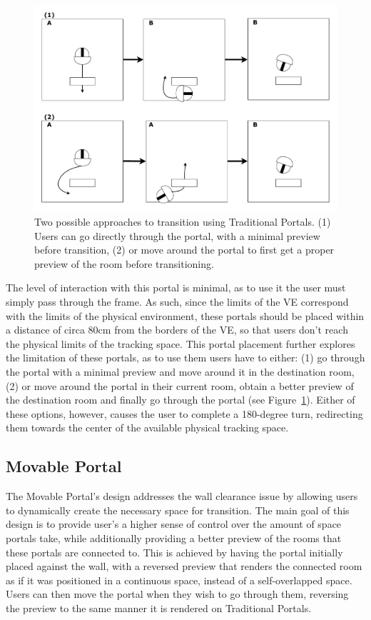 \begin{figure}[b]
    \centering
     \includegraphics[width=.75\textwidth]{NOVAthesisFiles/Images/schemes/trad-interaction.drawio.pdf}
     \caption[Interaction design of the Traditional Portal.]
     {Two possible approaches to transition using Traditional Portals. (1) Users can go directly through the portal, with a minimal preview 
     before transition, (2) or move around the portal to first get a proper preview of the room before transitioning.}
     \label{fig:trad-portal-interaction}
\end{figure}

The level of interaction with this portal is minimal, as to use it the user must simply pass through the frame. 
As such, since the limits of the \gls{VE} correspond with the limits of the physical environment, these portals should be placed within a 
distance of circa 80cm  from the borders of the \gls{VE}, so that users don't reach the physical limits of the tracking space.
This portal placement further explores the limitation of these portals, as to use them users have to either: (1) go through the portal with a 
minimal preview and move around it in the destination room, (2) or move around the portal in their current room, obtain a better preview of the 
destination room and finally go through the portal (see Figure~\ref{fig:trad-portal-interaction}). Either of these options, however, causes the user to complete a 
180-degree turn, redirecting them towards the center of the available physical tracking space.


\subsection{Movable Portal}
\label{sec:mov-portal-design}

The Movable Portal's design addresses the wall clearance issue by allowing users to dynamically create the necessary space for transition. The main 
goal of this design is to provide user's a higher sense of control over the amount of space portals take, while additionally providing a better 
preview of the rooms that these portals are connected to. This is achieved by having the portal initially placed against the wall, with a reversed 
preview that renders the connected room as if it was positioned in a continuous space, instead of a self-overlapped space. Users can then move 
the portal when they wish to go through them, reversing the preview to the same manner it is rendered on Traditional Portals.

